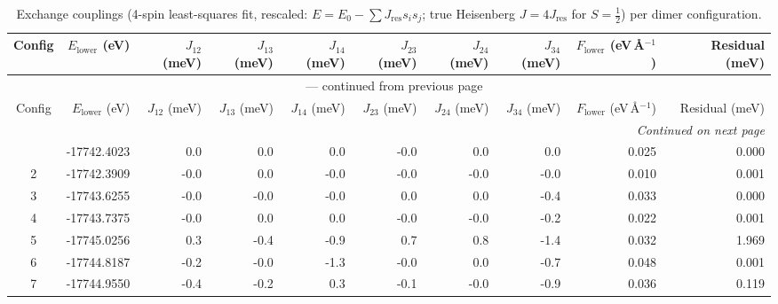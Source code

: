 
\begin{longtable}{@{}crrrrrrrrr@{}}
\caption{Exchange couplings (4-spin least-squares fit, rescaled: $E=E_0-\sum J_{\mathrm{res}} s_i s_j$; true Heisenberg $J=4J_{\mathrm{res}}$ for $S=\tfrac12$) per dimer configuration.}
\label{tab:exchange_couplings_4spin}\\
\toprule
Config & $E_{\mathrm{lower}}$ (eV) & $J_{12}$ (meV) & $J_{13}$ (meV) & $J_{14}$ (meV) & $J_{23}$ (meV) & $J_{24}$ (meV) & $J_{34}$ (meV) & $F_{\mathrm{lower}}$ (eV\,\AA$^{-1}$) & Residual (meV)\\
\midrule
\endfirsthead
\multicolumn{10}{c}{{\tablename}~\thetable{} --- continued from previous page}\\
\toprule
Config & $E_{\mathrm{lower}}$ (eV) & $J_{12}$ (meV) & $J_{13}$ (meV) & $J_{14}$ (meV) & $J_{23}$ (meV) & $J_{24}$ (meV) & $J_{34}$ (meV) & $F_{\mathrm{lower}}$ (eV\,\AA$^{-1}$) & Residual (meV)\\
\midrule
\endhead
\midrule
\multicolumn{10}{r}{\emph{Continued on next page}}\\
\endfoot
\bottomrule
\endlastfoot
1 & -17742.4023 & \textcolor{red!20}{0.0} & \textcolor{red!20}{0.0} & \textcolor{red!20}{0.0} & \textcolor{blue!20}{-0.0} & \textcolor{red!20}{0.0} & \textcolor{red!20}{0.0} & 0.025 & 0.000 \\
2 & -17742.3909 & \textcolor{blue!20}{-0.0} & \textcolor{red!20}{0.0} & \textcolor{blue!20}{-0.0} & \textcolor{blue!20}{-0.0} & \textcolor{blue!20}{-0.0} & \textcolor{blue!20}{-0.0} & 0.010 & 0.001 \\
3 & -17743.6255 & \textcolor{blue!20}{-0.0} & \textcolor{blue!20}{-0.0} & \textcolor{blue!20}{-0.0} & \textcolor{red!20}{0.0} & \textcolor{red!20}{0.0} & \textcolor{blue!25}{-0.4} & 0.033 & 0.000 \\
4 & -17743.7375 & \textcolor{blue!20}{-0.0} & \textcolor{red!20}{0.0} & \textcolor{red!20}{0.0} & \textcolor{blue!20}{-0.0} & \textcolor{blue!20}{-0.0} & \textcolor{blue!23}{-0.2} & 0.022 & 0.001 \\
5 & -17745.0256 & \textcolor{red!23}{0.3} & \textcolor{blue!25}{-0.4} & \textcolor{blue!33}{-0.9} & \textcolor{red!29}{0.7} & \textcolor{red!30}{0.8} & \textcolor{blue!40}{-1.4} & 0.032 & 1.969 \\
6 & -17744.8187 & \textcolor{blue!22}{-0.2} & \textcolor{blue!20}{-0.0} & \textcolor{blue!38}{-1.3} & \textcolor{blue!20}{-0.0} & \textcolor{red!20}{0.0} & \textcolor{blue!29}{-0.7} & 0.048 & 0.001 \\
7 & -17744.9550 & \textcolor{blue!25}{-0.4} & \textcolor{blue!22}{-0.2} & \textcolor{red!23}{0.3} & \textcolor{blue!20}{-0.1} & \textcolor{blue!20}{-0.0} & \textcolor{blue!32}{-0.9} & 0.036 & 0.119 \\

\end{longtable}
